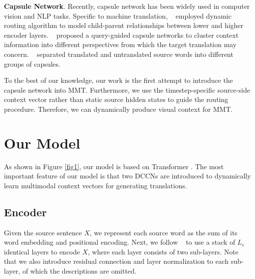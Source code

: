 \documentclass[sigconf]{acmart}
\begin{document}
\textbf{Capsule Network}.
Recently, capsule network has been widely used in computer vision 
\cite{DBLP:conf/iclr/XinyiC19,DBLP:conf/eccv/LiGDOW18,DBLP:conf/iccv/SinghN0V19,DBLP:journals/spl/XiangZTZX18,DBLP:conf/eccv/JaiswalA0N18,DBLP:journals/corr/abs-1812-00303} 
and NLP \cite{DBLP:conf/iclr/XinyiC19,chen2019transfer,yang-etal-2018-investigating,aly2019hierarchical} tasks. 
Specific to machine translation, \citeauthor{DBLP:conf/emnlp/Wang19}~ employed dynamic routing algorithm to model child-parent relationships between lower and higher encoder layers. 
\citeauthor{DBLP:conf/emnlp/YangZMGFZ19}~ proposed a query-guided capsule networks to cluster context information into  different perspectives from which the target translation may concern. 
\citeauthor{DBLP:conf/emnlp/ZhengHTDC19}~ separated translated and untranslated source words into different groups of capsules. 

To the best of our knowledge, 
our work is the first attempt to introduce the capsule network into MMT. 
Furthermore, 
we use the timestep-specific source-side context vector rather than static source hidden states to guide the routing procedure. 
Therefore, we can dynamically produce visual context for MMT. 





\section{Our Model}
As shown in Figure \ref{fig1}, our model is based on Transformer \cite{vaswani2017attention}. 
The most important feature of our model is that two DCCNs are introduced to dynamically learn multimodal context vectors for  generating translations.



\subsection{Encoder}

Given the source sentence $X$, 
we represent each source word as the sum of its word embedding and positional encoding. 
Next, 
we follow \citeauthor{vaswani2017attention}~ to use a stack of $L_{e}$ identical layers to encode $X$, 
where each layer consists of two sub-layers. 
Note that we also introduce residual connection and layer normalization to each sub-layer, of which the descriptions are omitted.
\end{document}
